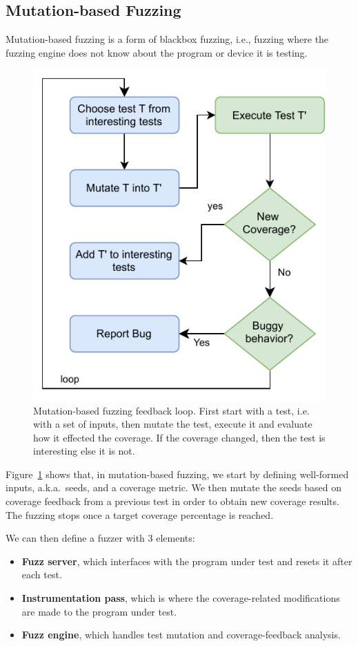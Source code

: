 \documentclass[conference]{IEEEtran}
\newcommand{\todo}[1]{{\color{olive} TODO: #1}}
\begin{document}
\subsection{Mutation-based Fuzzing}
Mutation-based fuzzing is a form of blackbox fuzzing, i.e., fuzzing where the fuzzing engine does not know about the program or device it is testing.
\begin{figure}
  \centering
    \includegraphics[width=0.9\linewidth]{mutation-fuzzing.pdf}
    \caption{Mutation-based fuzzing feedback loop. First start with a test, i.e.\, with a set of inputs, then mutate the test, execute it and evaluate how it effected the coverage. If the coverage changed, then the test is interesting else it is not.}
\label{fig:mut-fuzz}
\end{figure}

Figure~\ref{fig:mut-fuzz} shows that, in mutation-based fuzzing, we start by defining well-formed inputs, a.k.a.\ seeds, and a coverage metric. 
We then mutate the seeds based on coverage feedback from a previous test in order to obtain new coverage results. 
The fuzzing stops once a target coverage percentage is reached.

We can then define a fuzzer with 3 elements:
\begin{itemize}
\item \textbf{Fuzz server}, which interfaces with the program under test and resets it after each test.
\item \textbf{Instrumentation pass}, which is where the coverage-related modifications are made to the program under test.
\item \textbf{Fuzz engine}, which handles test mutation and coverage-feedback analysis.
\end{itemize}
\end{document}
